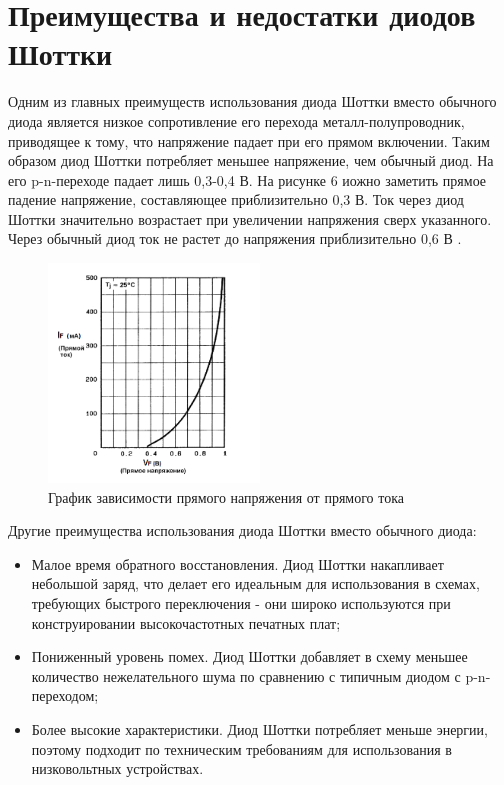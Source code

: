 \documentclass[spec, och, referat]{shiza}
\begin{document}
\section{Преимущества и недостатки диодов Шоттки}

Одним из главных преимуществ использования диода Шоттки вместо обычного диода является низкое сопротивление его перехода металл-полупроводник, 
приводящее к тому, что напряжение падает при его прямом включении. Таким образом диод Шоттки потребляет меньшее напряжение, чем обычный диод. 
На его p-n-переходе падает лишь 0,3-0,4 В. На рисунке 6 иожно заметить прямое падение напряжение, составляющее приблизительно 0,3 В. Ток 
через диод Шоттки значительно возрастает при увеличении напряжения сверх указанного. Через обычный диод ток не растет до напряжения приблизительно 0,6 В \cite{2}.

\begin{figure}[H]
  \centering
  \includegraphics[width=0.5\textwidth]{photo/6.png}
  \caption{График зависимости прямого напряжения от прямого тока}
\end{figure}



Другие преимущества использования диода Шоттки вместо обычного диода:

\begin{itemize}
  \item Малое время обратного восстановления. Диод Шоттки накапливает небольшой заряд, что делает его идеальным для использования в схемах, 
  требующих быстрого переключения - они широко используются при конструировании высокочастотных печатных плат;
  \item Пониженный уровень помех. Диод Шоттки добавляет в схему меньшее количество нежелательного шума по сравнению с типичным диодом с p-n-переходом;
  \item Более высокие характеристики. Диод Шоттки потребляет меньше энергии, поэтому подходит по техническим требованиям для использования в низковольтных устройствах.
\end{itemize}
\end{document}
